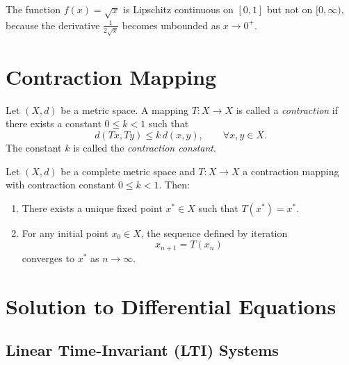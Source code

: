 \begin{example}
    The function $f(x) = \sqrt{x}$ is Lipschitz continuous on $[0,1]$ but not on $[0,\infty)$, because the derivative $\frac{1}{2\sqrt{x}}$ becomes unbounded as $x \to 0^+$.
\end{example}

\section{Contraction Mapping}

\begin{definition}
    Let $(X,d)$ be a metric space.  
    A mapping $T: X \to X$ is called a \emph{contraction} if there exists a constant $0 \leq k < 1$ such that
    \[
        d(Tx,Ty) \leq k \, d(x,y), \qquad \forall x,y \in X.
    \]
    The constant $k$ is called the \emph{contraction constant}.
\end{definition}


\begin{theorem}
    Let $(X,d)$ be a complete metric space and $T:X \to X$ a contraction mapping with contraction constant $0 \leq k < 1$.  
    Then:
    \begin{enumerate}
        \item There exists a unique fixed point $x^* \in X$ such that $T(x^*) = x^*$.
        \item For any initial point $x_0 \in X$, the sequence defined by iteration
        \[
            x_{n+1} = T(x_n)
        \]
        converges to $x^*$ as $n \to \infty$.
    \end{enumerate}
\end{theorem}

\section{Solution to Differential Equations}

\subsection{Linear Time-Invariant (LTI) Systems}

